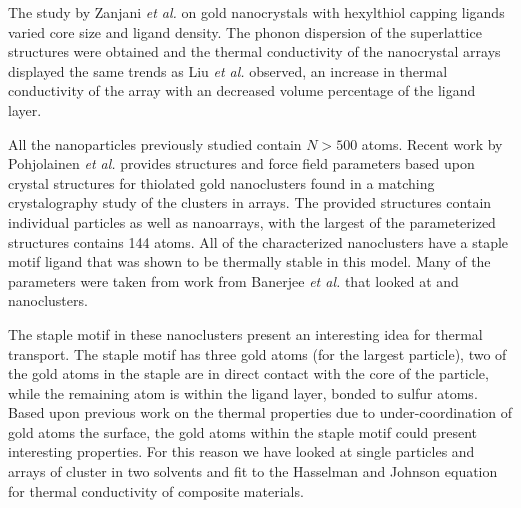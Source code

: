 The study by Zanjani \textit{et al.} on gold nanocrystals with hexylthiol capping ligands varied core size and ligand density.\cite{Zanjani2014}
The phonon dispersion of the superlattice structures were obtained and the thermal conductivity of the nanocrystal arrays displayed the same trends as Liu \textit{et al.} observed, an increase in thermal conductivity of the array with an decreased volume percentage of the ligand layer.\cite{Liu2015} 

All the nanoparticles previously studied contain $N> 500$ atoms. Recent work by Pohjolainen \textit{et al.} provides structures and force field parameters based upon crystal structures for thiolated gold nanoclusters found in a matching crystalography study of the clusters in arrays.\cite{Pohjolainen2016} 
The provided structures contain individual particles as well as nanoarrays, with the largest of the parameterized structures contains 144  atoms. All of the characterized nanoclusters have a staple motif ligand that was shown to be thermally stable in this model. Many of the parameters were taken from work from Banerjee \textit{et al.} that looked at  and  nanoclusters.

The staple motif in these nanoclusters present an interesting idea for thermal transport. 
The staple motif has three gold atoms (for the largest particle), two of the gold atoms in the staple are in direct contact with the core of the particle, while the remaining atom is within the ligand layer, bonded to sulfur atoms. Based upon previous work on the thermal properties due to under-coordination of gold atoms the surface,\cite{Neidhart2017} the gold atoms within the staple motif could present interesting properties. 
For this reason we have looked at single particles and arrays of  cluster in two solvents and fit to the Hasselman and Johnson equation for thermal conductivity of composite materials.\cite{Hasselman}
